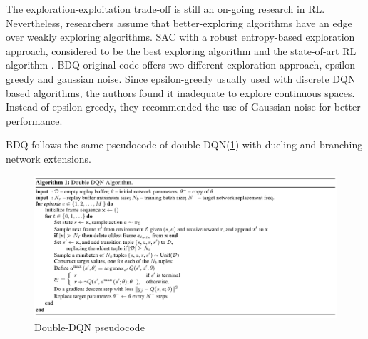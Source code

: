 The exploration-exploitation trade-off is still an on-going research in RL. Nevertheless, researchers assume that better-exploring algorithms have an edge over weakly exploring algorithms. SAC with a robust entropy-based exploration approach, considered to be the best exploring algorithm and the state-of-art RL algorithm \cite{Haarnoja2018}. BDQ original code offers two different exploration approach, epsilon greedy and gaussian noise. Since epsilon-greedy usually used with discrete DQN based algorithms, the authors found it inadequate to explore continuous spaces. Instead of epsilon-greedy, they recommended the use of Gaussian-noise for better performance.

BDQ follows the same pseudocode of double-DQN(\ref{fig:bdqalgo}) with dueling and branching network extensions.

\begin{figure}[htbp] 
    \centering
    \includegraphics[width=1.0\textwidth]{figures/BDQalgo}
    \caption{Double-DQN pseudocode \cite{Wang2016}}
    \label{fig:bdqalgo}
\end{figure}